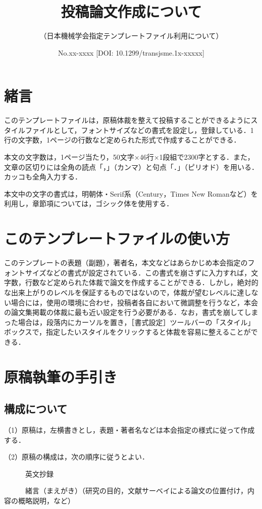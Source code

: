 \documentclass[a4jsme, fleqn, dvipdfmx]{jsmepaper}
\title{投稿論文作成について}
\subtitle{（日本機械学会指定テンプレートファイル利用について）}
\date{No.xx-xxxx [DOI: 10.1299/transjsme.1x-xxxxx]}
\begin{document}
\maketitle
\thispagestyle{empty}
%
%
\section{緒言}

このテンプレートファイルは，原稿体裁を整えて投稿することができるようにスタイルファイルとして，フォントサイズなどの書式を設定し，登録している．1行の文字数，1ページの行数など定められた形式で作成することができる．

本文の文字数は，1ページ当たり，50文字×46行×1段組で2300字とする．また，文章の区切りには全角の読点「，」（カンマ）と句点「．」（ピリオド）を用いる．カッコも全角入力する．

本文中の文字の書式は，明朝体・Serif系（Century，Times New Romanなど）を利用し，章節項については，ゴシック体を使用する．

\section{このテンプレートファイルの使い方}

このテンプレートの表題（副題），著者名，本文などはあらかじめ本会指定のフォントサイズなどの書式が設定されている．この書式を崩さずに入力すれば，文字数，行数など定められた体裁で論文を作成することができる．しかし，絶対的な出来上がりのレベルを保証するものではないので，体裁が望むレベルに達しない場合には，使用の環境に合わせ，投稿者各自において微調整を行うなど，本会の論文集掲載の体裁に最も近い設定を行う必要がある．なお，書式を崩してしまった場合は，段落内にカーソルを置き，［書式設定］ツールバーの「スタイル」ボックスで，指定したいスタイルをクリックすると体裁を容易に整えることができる．

\section{原稿執筆の手引き}
\subsection{構成について}
（1）原稿は，左横書きとし，表題・著者名などは本会指定の様式に従って作成する．

（2）原稿の構成は，次の順序に従うとよい．

　　　英文抄録

　　　緒言（まえがき）（研究の目的，文献サーベイによる論文の位置付け，内容の概略説明，など）
\end{document}
